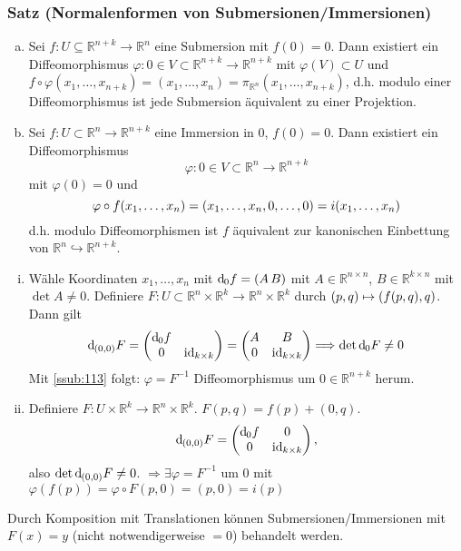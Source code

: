 \subsubsection{Satz (Normalenformen von Submersionen/Immersionen)} %
\label{ssub:115}
\begin{enumerate}[a)]
	\item Sei $f : U \subseteq \mathds{R}^{n+k} \to \mathds{R}^n$ eine Submersion mit $f(0)=0$. Dann existiert ein Diffeomorphismus 
	$\varphi : 0 \in V \subset \mathds{R}^{n+k} \to \mathds{R}^{n+k}$ mit $\varphi(V) \subset U$ und 
	$f \circ \varphi(x_1, \ldots , x_{n+k}) = (x_1, \ldots , x_n) = \pi_{\mathds{R}^n}(x_1, \ldots , x_{n+k})$, d.h. modulo einer Diffeomorphismus ist jede Submersion 
	äquivalent zu einer Projektion.
	\item Sei $f : U \subset \mathds{R}^n \to \mathds{R}^{n+k}$ eine Immersion in $0$, $f(0)=0$. Dann existiert ein Diffeomorphismus 
	\[
		\varphi : 0 \in V \subset \mathds{R}^n \to \mathds{R}^{n+k}
	\]
	mit $\varphi(0)=0$ und 
	\[
		\varphi \circ f (x_1, \ldots ,x _n) = \enbrace*{x_1, \ldots , x_n, 0 , \ldots , 0} = i(x_1, \ldots , x_n) 
	\]
	d.h. modulo Diffeomorphismen ist $f$ äquivalent zur kanonischen Einbettung von $\mathds{R}^n \hookrightarrow \mathds{R}^{n+k}$.
\end{enumerate}
\begin{enumerate}[(i)]
	\item Wähle Koordinaten $x_1, \ldots , x_n$ mit $\mathd_0 f = (A \, B)$ mit $A \in \mathds{R}^{n \times n}$, $B \in \mathds{R}^{k \times n}$ mit $\det A \not= 0$.
	Definiere $F : U \subset \mathds{R}^n \times \mathds{R}^k \to \mathds{R}^n \times \mathds{R}^k $ durch $(p,q) \mapsto \enbrace*{f(p,q), q}$. Dann gilt
	\[
		\mathd_{(0,0)} F = \begin{pmatrix}
			\mathd_0 f & \\
			0 & \id_{k \times k}
		\end{pmatrix} = \begin{pmatrix}
			A & B \\
			0 & \id_{k \times k} 
		\end{pmatrix}
		\Longrightarrow \det \mathd_0 F \not= 0
	\]
	Mit \ref{ssub:113} folgt: $\varphi = F ^{-1}$ Diffeomorphismus um $0 \in \mathds{R}^{n+k}$ herum.
	\item Definiere $F : U \times \mathds{R}^k \to \mathds{R}^n \times \mathds{R}^k$. $F(p,q) = f(p)+ (0,q)$.
	\[
		\mathd_{(0,0)} F = \begin{pmatrix}
			\mathd_0 f & 0 \\
			0 & \id_{k \times k}
		\end{pmatrix},
	\]
	also $\det \mathd_{(0,0)} F \not= 0$. $\Rightarrow  \exists \varphi = F ^{-1}$ um $0$ mit $\varphi(f(p))=\varphi \circ F (p,0) = (p,0) = i(p)$ \bewende
\end{enumerate}
Durch Komposition mit Translationen können Submersionen/Immersionen mit $F(x)=y$ (nicht notwendigerweise $=0$) behandelt werden.

